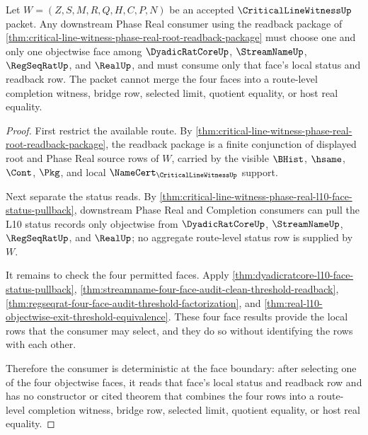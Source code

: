 \begin{theorem}
\label{thm:critical-line-witness-phase-real-consumer-determinacy}
Let $W=(Z,S,M,R,Q,H,C,P,N)$ be an accepted $\CriticalLineWitnessUp$ packet. Any downstream Phase Real consumer using the readback package of \autoref{thm:critical-line-witness-phase-real-root-readback-package} must choose one and only one objectwise face among $\DyadicRatCoreUp$, $\StreamNameUp$, $\RegSeqRatUp$, and $\RealUp$, and must consume only that face's local status and readback row. The packet cannot merge the four faces into a route-level completion witness, bridge row, selected limit, quotient equality, or host real equality.
\end{theorem}
\begin{proof}
First restrict the available route. By \autoref{thm:critical-line-witness-phase-real-root-readback-package}, the readback package is a finite conjunction of displayed root and Phase Real source rows of $W$, carried by the visible $\BHist$, $\hsame$, $\Cont$, $\Pkg$, and local $\NameCert_{\CriticalLineWitnessUp}$ support.

Next separate the status reads. By \autoref{thm:critical-line-witness-phase-real-l10-face-status-pullback}, downstream Phase Real and Completion consumers can pull the L10 status records only objectwise from $\DyadicRatCoreUp$, $\StreamNameUp$, $\RegSeqRatUp$, and $\RealUp$; no aggregate route-level status row is supplied by $W$.

It remains to check the four permitted faces. Apply \autoref{thm:dyadicratcore-l10-face-status-pullback}, \autoref{thm:streamname-four-face-audit-clean-threshold-readback}, \autoref{thm:regseqrat-four-face-audit-threshold-factorization}, and \autoref{thm:real-l10-objectwise-exit-threshold-equivalence}. These four face results provide the local rows that the consumer may select, and they do so without identifying the rows with each other.

Therefore the consumer is deterministic at the face boundary: after selecting one of the four objectwise faces, it reads that face's local status and readback row and has no constructor or cited theorem that combines the four rows into a route-level completion witness, bridge row, selected limit, quotient equality, or host real equality.
\end{proof}
